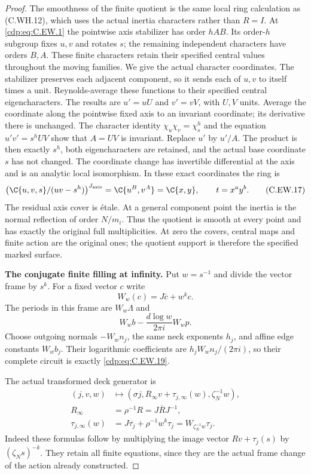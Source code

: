 \begin{proof}
The smoothness of the finite quotient is the same
local ring calculation as (C.WH.12), which uses
the actual inertia characters rather than $R=I$.
At \eqref{cdp:eq:C.EW.1} the pointwise axis stabilizer has order
$hAB$. Its order-$h$ subgroup fixes $u,v$ and rotates
$s$; the remaining independent characters have
orders $B,A$. These finite characters retain their
specified central values throughout the moving
families. We give the actual character coordinates.
The stabilizer preserves each adjacent component,
so it sends each of $u,v$ to itself times a unit.
Reynolds-average these functions to their specified
central eigencharacters. The results are $u'=uU$
and $v'=vV$, with $U,V$ units. Average the coordinate
along the pointwise fixed axis to an invariant
coordinate; its derivative there is unchanged.
The character identity
$\chi_u\chi_v=\chi_s^h$ and the equation
$u'v'=s^hUV$ show that $A=UV$ is invariant.
Replace $u'$ by $u'/A$. The product is then exactly
$s^h$, both eigencharacters are retained, and the
actual base coordinate $s$ has not changed. The
coordinate change has invertible differential at
the axis and is an analytic local isomorphism.
In these exact coordinates the ring is
\[
 \bigl(\C\{u,v,s\}/(uv-s^h)\bigr)^{J_{\rm axis}}
                         =\C\{u^B,v^A\}
                         =\C\{x,y\},
 \qquad t=x^a y^b.
\tag{C.EW.17}\label{cdp:eq:C.EW.17}
\]
The residual axis cover is \'{e}tale. At a general
component point the inertia is the normal reflection
of order $N/m_i$. Thus the quotient is smooth at
every point and has exactly the original full
multiplicities. At zero the covers, central maps and
finite action are the original ones; the quotient
support is therefore the specified marked surface.

\par\medskip\noindent\textbf{The conjugate finite filling at infinity.}
Put $w=s^{-1}$ and divide the vector frame by $s^k$.
For a fixed vector $c$ write
\[
 W_w(c)=J\overline c+w^k c.
\tag{C.EW.18}\label{cdp:eq:C.EW.18}
\]
The periods in this frame are $W_w\Lambda$ and
\[
                    W_wb-\frac{d\log w}{2\pi i}W_wp.
\tag{C.EW.19}\label{cdp:eq:C.EW.19}
\]
Choose outgoing normals $-W_wn_j$, the same neck
exponents $h_j$, and affine edge constants $W_wb_j$.
Their logarithmic coefficients are
$h_jW_wn_j/(2\pi i)$, so their complete circuit is
exactly \eqref{cdp:eq:C.EW.19}.

The actual transformed deck generator is
\[
 \begin{aligned}
 (j,v,w)&\longmapsto
     (\sigma j,R_\infty v+\tau_{j,\infty}(w),\zeta_N^{-1}w),\\
 R_\infty&=\rho^{-1}R=J\overline R J^{-1},\\
 \tau_{j,\infty}(w)
     &=J\overline{\tau_j}+\rho^{-1}w^k\tau_j
       =W_{\zeta_N^{-1}w}\tau_j.
 \end{aligned}
\tag{C.EW.20}\label{cdp:eq:C.EW.20}
\]
Indeed these formulas follow by multiplying the image
vector $Rv+\tau_j(s)$ by $(\zeta_Ns)^{-k}$.
They retain all finite equations, since they are the
actual frame change of the action already constructed.


\end{proof}
